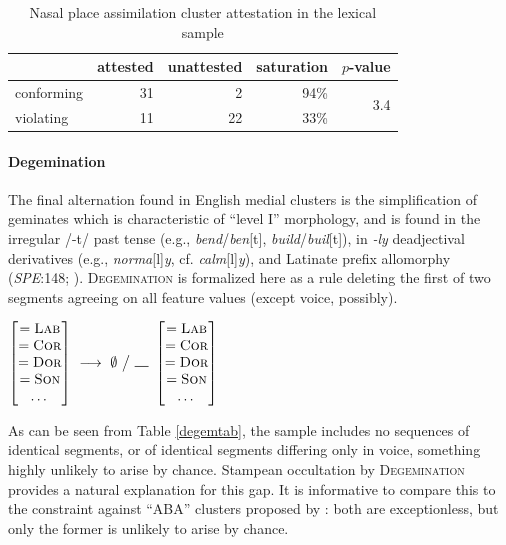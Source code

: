 \begin{table}
\centering
\begin{tabular}{l rrrr}
\toprule
           & attested & unattested & saturation & $p$-value \\
\midrule
conforming & 31       & 2          & 94\%       & \multirow{2}{*}{3.4\e{-07}} \\
violating  & 11       & 22         & 33\%       \\
\bottomrule
\end{tabular}
\caption{Nasal place assimilation cluster attestation in the lexical sample}
\label{npatab}
\end{table}

\paragraph{Degemination} 
The final alternation found in English medial clusters is the simplification of geminates which is characteristic of ``level I'' morphology, and is found in the irregular /-t/ past tense (e.g., \emph{bend}/\emph{ben}[t], \emph{build}/\emph{buil}[t]), in \emph{-ly} deadjectival derivatives (e.g., \emph{norma}[l]\emph{y}, cf. \emph{calm}[l]\emph{y}), and Latinate prefix allomorphy (\emph{SPE}:148; \citealt[102]{Borowsky1986}). \textsc{Degemination} is formalized here as a rule deleting the first of two segments agreeing on all feature values (except voice, possibly).
\label{degemx}

\begin{example}
$\begin{bmatrix} =\textsc{Lab} \\ =\textsc{Cor} \\ =\textsc{Dor} \\ =\textsc{Son} \\ \ldots{} \end{bmatrix}~\goesto~\emptyset~\big /~\gap~\begin{bmatrix} =\textsc{Lab} \\ =\textsc{Cor} \\ =\textsc{Dor} \\ =\textsc{Son} \\ \ldots{} \end{bmatrix}$
\end{example}

\noindent
As can be seen from Table \ref{degemtab}, the sample includes no sequences of identical segments, or of identical segments differing only in voice, something highly unlikely to arise by chance.
Stampean occultation by \textsc{Degemination} provides a natural explanation for this gap.
It is informative to compare this to the constraint against ``ABA'' clusters proposed by \citeauthor{Pierrehumbert1994}: both are exceptionless, but only the former is unlikely to arise by chance.

